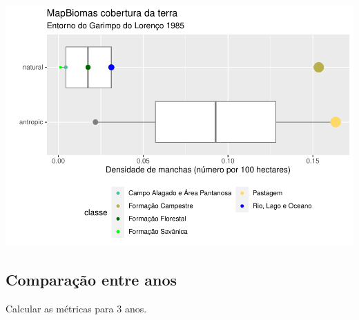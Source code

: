 \documentclass[
]{article}
\begin{document}
\includegraphics{epr_files/figure-latex/unnamed-chunk-68-1.pdf}

\hypertarget{comparauxe7uxe3o-entre-anos}{%
\subsection{Comparação entre anos}\label{comparauxe7uxe3o-entre-anos}}

Calcular as métricas para 3 anos.
\end{document}
